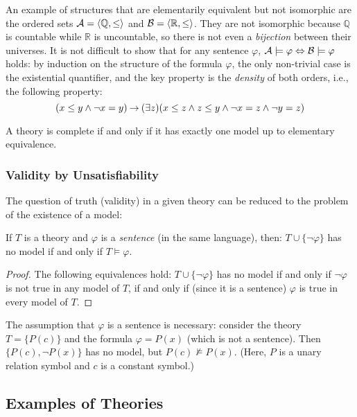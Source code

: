 \begin{example}\label{example:elementary-equivalence-of-orders-R-Q}
    An example of structures that are elementarily equivalent but not isomorphic are the ordered sets $\mathcal{A}=\langle\mathbb Q,\leq\rangle$ and $\mathcal{B}=\langle\mathbb R,\leq\rangle$. They are not isomorphic because $\mathbb Q$ is countable while $\mathbb R$ is uncountable, so there is not even a \emph{bijection} between their universes. It is not difficult to show that for any sentence $\varphi$, $\mathcal{A}\models\varphi\Leftrightarrow\mathcal{B}\models\varphi$ holds: by induction on the structure of the formula $\varphi$, the only non-trivial case is the existential quantifier, and the key property is the \emph{density} of both orders, i.e., the following property:
    $$
    (x\leq y\land \neg x=y)\mathbin{\rightarrow}(\exists z)(x\leq z\land z\leq y\land \neg x=z\land\neg y=z)
    $$

\end{example}
\begin{observation}
    A theory is complete if and only if it has exactly one model up to elementary equivalence.    
\end{observation}

\subsubsection{Validity by Unsatisfiability}

The question of truth (validity) in a given theory can be reduced to the problem of the existence of a model:
\begin{proposition}
    If $T$ is a theory and $\varphi$ is a \emph{sentence} (in the same language), then: $T\cup\{\neg\varphi\}$ has no model if and only if $T\models\varphi$.
\end{proposition}
\begin{proof}
    The following equivalences hold: $T\cup\{\neg\varphi\}$ has no model if and only if $\neg\varphi$ is not true in any model of $T$, if and only if (since it is a sentence) $\varphi$ is true in every model of $T$. 
\end{proof}

The assumption that $\varphi$ is a sentence is necessary: consider the theory $T=\{P(c)\}$ and the formula $\varphi=P(x)$ (which is not a sentence). Then $\{P(c),\neg P(x)\}$ has no model, but $P(c)\not\models P(x)$. (Here, $P$ is a unary relation symbol and $c$ is a constant symbol.)

\subsection{Examples of Theories}

